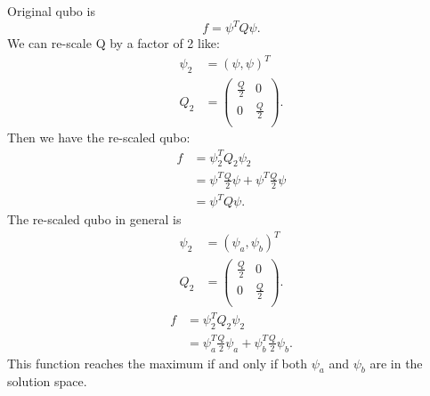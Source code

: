\documentclass[]{article}
\begin{document}
Original qubo is
\begin{equation}
f= \psi^T Q \psi .
\end{equation}
We can re-scale Q by a factor of 2 like:
 \begin{align}
\psi_2 &= (\psi , \psi)^T \\
Q_2 &= 
\begin{pmatrix}
\frac{Q}{2} & 0 \\
0 & \frac{Q}{2} \\
\end{pmatrix} .
\end{align}
Then we have the re-scaled qubo:
\begin{align}
f &= \psi_2^T Q_2 \psi_2 \\
&=  \psi^T  \frac{Q}{2} \psi +  \psi^T  \frac{Q}{2} \psi \\
&=  \psi^T Q \psi .
\end{align}
The re-scaled qubo in general is
 \begin{align}
\psi_2 &= (\psi_a , \psi_b)^T \\
Q_2 &= 
\begin{pmatrix}
\frac{Q}{2} & 0 \\
0 & \frac{Q}{2} \\
\end{pmatrix} .
\end{align}
\begin{align}
f &= \psi_2^T Q_2 \psi_2 \\
&=  \psi_a^T  \frac{Q}{2} \psi_a +  \psi_b^T  \frac{Q}{2} \psi_b .
\end{align}
This function reaches the maximum if and only if both $\psi_a$ and $\psi_b$ are in the solution space.
\end{document}
